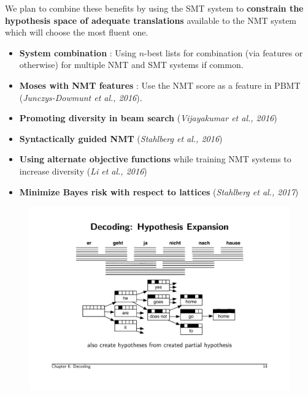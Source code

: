 \documentclass[landscape]{jhuslides3C}
\begin{document}
We plan to combine these benefits by using the SMT system to \textbf{constrain the hypothesis space of adequate translations} available to the NMT system which will choose the most fluent one.

\begin{itemize}
\item \textbf{System combination} : Using $n$-best lists for combination (via features or otherwise) for multiple NMT and SMT systems if common.
\item \textbf{Moses with NMT features} : Use the NMT score as a feature in PBMT (\textit{Junczys-Dowmunt et al., 2016}).
\item \textbf{Promoting diversity in beam search} (\textit{Vijayakumar et al., 2016}) 
\item \textbf{Syntactically guided NMT} (\textit{Stahlberg et al., 2016}) 
\item \textbf{Using alternate objective functions} while training NMT systems to increase diversity (\textit{Li et al., 2016})
\item \textbf{Minimize Bayes risk with respect to lattices} (\textit{Stahlberg et al., 2017})
\end{itemize}


\begin{figure}
\begin{center}
\includegraphics[scale=1.2]{images/graph.pdf}
\end{center}
\end{figure}
\end{document}
